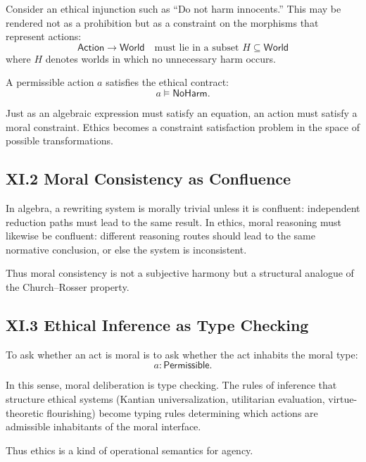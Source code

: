 \documentclass[11pt,letterpaper]{article}
\begin{document}
Consider an ethical injunction such as ``Do not harm innocents.'' This may be rendered not as a prohibition but as a constraint on the morphisms that represent actions:
\[
\mathsf{Action} \to \mathsf{World} \quad \text{must lie in a subset } H \subseteq \mathsf{World}
\]
where \(H\) denotes worlds in which no unnecessary harm occurs.

A permissible action \(a\) satisfies the ethical contract:
\[
a \vDash \mathsf{NoHarm}.
\]

Just as an algebraic expression must satisfy an equation, an action must satisfy a moral constraint. Ethics becomes a constraint satisfaction problem in the space of possible transformations.

\subsection{XI.2 Moral Consistency as Confluence}

In algebra, a rewriting system is morally trivial unless it is confluent: independent reduction paths must lead to the same result. In ethics, moral reasoning must likewise be confluent: different reasoning routes should lead to the same normative conclusion, or else the system is inconsistent.

Thus moral consistency is not a subjective harmony but a structural analogue of the Church–Rosser property.

\subsection{XI.3 Ethical Inference as Type Checking}

To ask whether an act is moral is to ask whether the act inhabits the moral type:
\[
a : \mathsf{Permissible}.
\]

In this sense, moral deliberation is type checking. The rules of inference that structure ethical systems (Kantian universalization, utilitarian evaluation, virtue-theoretic flourishing) become typing rules determining which actions are admissible inhabitants of the moral interface.

Thus ethics is a kind of operational semantics for agency.

\end{document}
